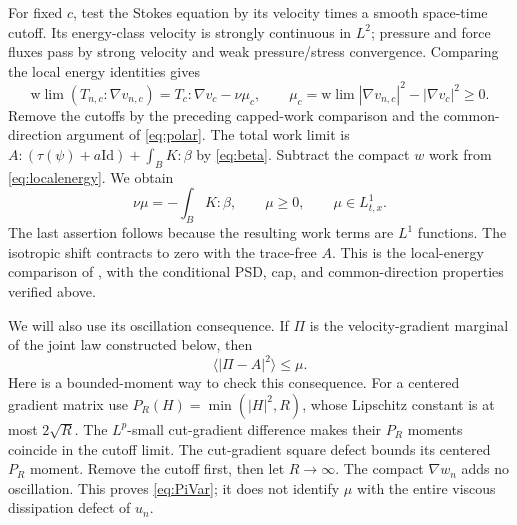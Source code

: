 \documentclass[11pt]{article}
\numberwithin{equation}{section}
\newcommand{\grad}{\nabla}
\newcommand{\Id}{\mathrm{Id}}
\newcommand{\pair}[1]{\langle #1\rangle}
\begin{document}
For fixed $c$, test the Stokes equation by its velocity times a smooth
space-time cutoff. Its energy-class velocity is strongly continuous in
$L^2$; pressure and force fluxes pass by strong velocity and weak
pressure/stress convergence. Comparing the local energy identities gives
\begin{equation}\label{eq:localenergy}
 \mathrm{w}\!\lim(T_{n,c}:\grad v_{n,c})
       =T_c:\grad v_c-\nu\mu_c,
 \qquad
 \mu_c=\mathrm{w}\!\lim|\grad v_{n,c}|^2-|\grad v_c|^2\geq0.
\end{equation}
Remove the cutoffs by the preceding capped-work comparison and the
common-direction argument of \eqref{eq:polar}. The total work limit is
$A:(\tau(\psi)+a\Id)+\int_BK:\beta$ by \eqref{eq:beta}.
Subtract the compact $w$ work from \eqref{eq:localenergy}. We obtain
\begin{equation}\label{eq:mu}
 \nu\mu=-\int_BK:\beta,\qquad \mu\geq0,\qquad \mu\in L^1_{t,x}.
\end{equation}
The last assertion follows because the resulting work terms are $L^1$
functions. The isotropic shift contracts to zero with the trace-free $A$.
This is the local-energy comparison of \cite[Proposition~5.4]{Masmoudi},
with the conditional PSD, cap, and common-direction properties verified above.

We will also use its oscillation consequence. If $\Pi$ is the velocity-gradient
marginal of the joint law constructed below, then
\begin{equation}\label{eq:PiVar}
 \pair{|\Pi-A|^2}\leq\mu.
\end{equation}
Here is a bounded-moment way to check this consequence. For a centered gradient
matrix use $P_R(H)=\min(|H|^2,R)$, whose Lipschitz constant is at most
$2\sqrt R$. The $L^p$-small cut-gradient difference makes their $P_R$ moments
coincide in the cutoff limit. The cut-gradient square defect bounds its
centered $P_R$ moment. Remove the cutoff first, then let $R\to\infty$.
The compact $\grad w_n$ adds no oscillation. This proves
\eqref{eq:PiVar}; it does not identify $\mu$ with the entire viscous
dissipation defect of $u_n$.
\end{document}
